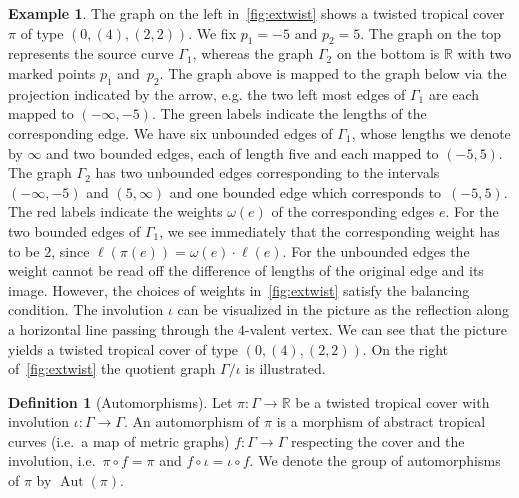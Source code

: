 \documentclass[10pt]{amsart}
\theoremstyle{plain}
\theoremstyle{definition}
\newtheorem{defi}[defi]{Definition}
\theoremstyle{definition}
\newtheorem{exam}[exam]{Example}
\theoremstyle{plain}
\theoremstyle{plain}
\theoremstyle{remark}
\theoremstyle{plain}
\theoremstyle{plain}
\DeclareMathOperator{\Aut}{Aut}
\begin{document}
\begin{exam}
The graph on the left in~\cref{fig:extwist} shows a twisted tropical cover $\pi$ of type $(0,(4),(2,2))$. We fix $p_1=-5$ and $p_2=5$. The graph on the top represents the source curve $\Gamma_1$, whereas the graph $\Gamma_2$ on the bottom is $\mathbb{R}$ with two marked points $p_1$ and~$p_2$. The graph above is mapped to the graph below via the projection indicated by the arrow, e.g. the two left most edges of $\Gamma_1$ are each mapped to $(-\infty,-5)$. The green labels indicate the lengths of the corresponding edge. We have six unbounded edges of $\Gamma_1$, whose lengths we denote by $\infty$ and two bounded edges, each of length five and each mapped to $(-5,5)$. The graph $\Gamma_2$ has two unbounded edges corresponding to the intervals $(-\infty,-5)$ and $(5,\infty)$ and one bounded edge which corresponds to~$(-5,5)$. The red labels indicate the weights $\omega(e)$ of the corresponding edges $e$. For the two bounded edges of $\Gamma_1$, we see immediately that the corresponding weight has to be $2$, since $\ell(\pi(e))=\omega(e)\cdot \ell(e)$. For the unbounded edges the weight cannot be read off the difference of lengths of the original edge and its image. However, the choices of weights in~\cref{fig:extwist} satisfy the balancing condition. The involution $\iota$ can be visualized in the picture as the reflection along a horizontal line passing through the $4$-valent vertex. We can see that the picture
yields a twisted tropical cover of type $(0,(4),(2,2))$. On the right of~\cref{fig:extwist} the quotient graph $\Gamma/\iota$ is illustrated.
\end{exam}

\begin{defi}[Automorphisms]
    Let $\pi:\Gamma\rightarrow \mathbb{R}$ be a twisted tropical cover with involution $\iota:\Gamma\rightarrow \Gamma$. An automorphism of $\pi$ is a morphism of abstract tropical curves (i.e.\ a map of metric graphs) $f:\Gamma\rightarrow\Gamma$ respecting the cover and the involution, i.e.\ $\pi\circ f = \pi$ and $f\circ \iota = \iota \circ f$. We denote the group of automorphisms of $\pi$ by $\Aut(\pi)$.
\end{defi}
\end{document}
